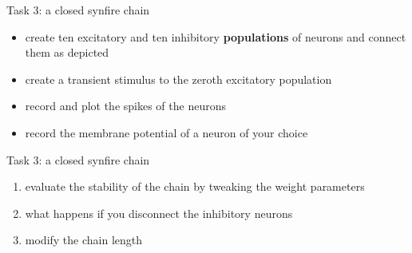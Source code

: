 \documentclass[aspectratio=169]{beamer}
\begin{document}
\begin{frame}{Task 3: a closed synfire chain}
\begin{center}
	\end{center}
		\begin{itemize}
			\item create ten excitatory and ten inhibitory \textbf{populations} of neurons and connect them as depicted
			\item create a transient stimulus to the zeroth excitatory population
			\item record and plot the spikes of the neurons
			\item record the membrane potential of a neuron of your choice
		\end{itemize}
\end{frame}

\begin{frame}{Task 3: a closed synfire chain}
	\begin{enumerate}
		\item evaluate the stability of the chain by tweaking the weight parameters
		\item what happens if you disconnect the inhibitory neurons
		\item modify the chain length
	\end{enumerate}
\end{frame}
\end{document}
